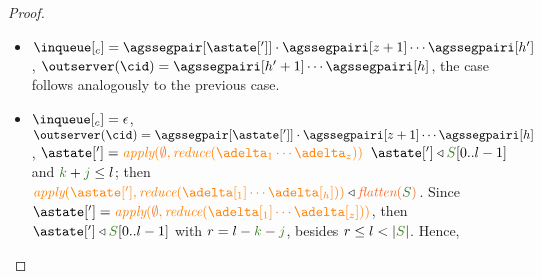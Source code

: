 \begin{proof}
\begin{itemize}
\begin{itemize}
\begin{itemize}
\begin{itemize}
						\[
						  \mathrulean{\lemref{lemma:reduce}}
						       {\ireduce{\adelta_1\cdots\adelta_{h'}}\triangleleft \anupdseq[_1]
							\quad
							\adelta_{h'+1} \triangleleft \anupdseq[_2]}
  						       {\ireduce{\adelta_1\cdots\adelta_{h'+1}}\triangleleft \anupdseq[_1]\cdot\anupdseq[_2]}  
						\]
					It remains to prove that
					\[\ireduce{\adelta_{h'+2}\cdots\adelta_h}\triangleleft \flatten{\queuemessage[\tknown+\treceivebuffer+m..|\queuemessage| - 1]}\]
					
					
					
					By $\lemref{lemma:reducefirst}$, $\flatten{\queuemessage[\tknown+\treceivebuffer..|\queuemessage| - 1]} = \anupdseq[_1]\cdot\anupdseq[_2]$, 
					$\ireduce{\adelta_{h'+1}\cdots\adelta_h}\triangleleft \anupdseq[_1]\cdot\anupdseq[_2]$ and 
					$\adelta_{h'+1} \triangleleft \anupdseq[_1]$, with 
					$\anupdseq[_1] = \flatten{ \queuemessage[\tknown+\treceivebuffer..\tknown+\treceivebuffer+m-1]}$,
					$\anupdseq[_2] = \flatten{ \queuemessage[\tknown+\treceivebuffer+m .. |\queuemessage| -1]}$,
					Then, we can build the following proof 
						 
					\[
						  \mathrulean{\lemref{lemma:reducefirst}}
						       {\ireduce{\adelta_{h'+1}\cdots\adelta_h}\triangleleft \anupdseq[_1]\cdot\anupdseq[_2]
							\quad
							\adelta_{h'+1} \triangleleft \anupdseq[_1]}
  						       {\ireduce{\adelta_{h'+2}\cdots\adelta_h}\triangleleft \anupdseq[_2]}  
					\]
					

					
						\item[{--}] The remaining properties straightforwardly hold.
							
					\end{itemize}	
					
					
				\item ${\inclient} = \agssegpair[{\astate[']}]\cdot\agssegpairi[{z+1}] \cdots \agssegpairi[h']$, 
              				  $\outserver(\cid) = \agssegpairi[h'+1] \cdots \agssegpairi[h]$, the case follows analogously to the previous case.


					
					\item  ${\inclient} = \epsilon$, 
     					          $\outserver(\cid) = \agssegpair[{\astate[']}]\cdot\agssegpairi[z+1] \cdots \agssegpairi[h]$, 
     						   $\astate['] = \iapply{\initialstate}{\ireduce{\adelta_1\cdots\adelta_{z}}}$
      						   $\astate['] \triangleleft \queuemessage[0 .. l - 1]$ and $\tknown+\treceivebuffer \leq l$;  
					then $\iapply{\astate[']}{\ireduce{\adelta[_1]\cdots\adelta[_{h}]}}\triangleleft \flatten{\queuemessage}$. 
					Since $\astate['] = \iapply{\initialstate}{\ireduce{\adelta[_1]\cdots\adelta[_{z}]}}$, then $\astate[']\triangleleft \queuemessage[0..l-1]$ with $r = l - \tknown - \treceivebuffer$, besides $r \leq l < |\queuemessage|$.  Hence,
				

\end{itemize}
\end{itemize}
\end{itemize}
\end{proof}
